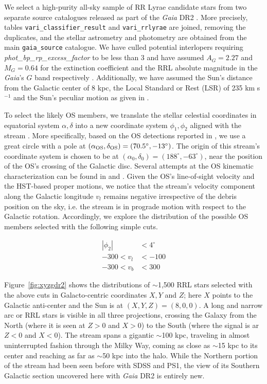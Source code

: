 \documentclass[a4paper,useAMS,usenatbib]{mnras}
\newcommand{\Gaia}{{\it Gaia}}
\newcommand{\gaia}{\textit{Gaia} }
\begin{document}
We select a high-purity all-sky sample of RR Lyrae candidate stars
from two separate source catalogues released as part of the \gaia DR2
\citep[][]{Prusti2016, Brown2018}. More precisely, tables
\texttt{vari\_classifier\_result} and \texttt{vari\_rrlyrae}
\citep[see][]{Clementini2018,Holl2018} are joined, removing the
duplicates, and the stellar astrometry and photometry are obtained
from the main \texttt{gaia\_source} catalogue. We have culled
potential interlopers requiring \textit{phot\_bp\_rp\_excess\_factor}
to be less than 3 and have assumed $A_G=2.27$ and $M_G=0.64$ for the
extinction coefficient and the RRL absolute magnitude in the \Gaia's
$G$ band respectively \citep[see][for further
  details]{Iorio2018}. Additionally, we have assumed the Sun's
distance from the Galactic center of 8 kpc, the Local Standard or Rest
(LSR) of 235 km s$^{-1}$ and the Sun's peculiar motion as given in
\citet{LSR}.

To select the likely OS members, we translate the stellar celestial
coordinates in equatorial system $\alpha, \delta$ into a new
coordinate system $\phi_1, \phi_2$ aligned with the stream \citep[see
  e.g.][]{Koposov2010}. More specifically, based on the OS detections
reported in \citet{OS_V, OS_C, Newberg2010}, we use a great circle
with a pole at $(\alpha_{\rm OS}, \delta_{\rm OS})=(70.5^{\circ},
-13^{\circ})$. The origin of this stream's coordinate system is chosen
to be at $(\alpha_0, \delta_0)=(188^{\circ}, -63^{\circ})$, near the
position of the OS's crossing of the Galactic disc. Several attempts
at the OS kinematic characterization can be found in
\citet{Newberg2010} and \citet{Sohn2016}. Given the OS's line-of-sight
velocity and the HST-based proper motions, we notice that the stream's
velocity component along the Galactic longitude $v_l$ remains negative
irrespective of the debris position on the sky, i.e. the stream is in
prograde motion with respect to the Galactic rotation. Accordingly, we
explore the distribution of the possible OS members selected with the
following simple cuts.

%
\begin{equation}
  \begin{aligned}
    |\phi_2| &< 4^{\circ}\\
    -300<v_l &<-100\\
    -300<v_b &<300
  \end{aligned}
\end{equation}
%

Figure~\ref{fig:xyzgdr2} shows the distributions of $\sim$1,500 RRL
stars selected with the above cuts in Galacto-centric coordinates
$X,Y$ and $Z$; here $X$ points to the Galactic anti-center and the Sun
is at $(X,Y,Z)=(8,0,0)$. A long and narrow arc or RRL stars is visible
in all three projections, crossing the Galaxy from the North (where it
is seen at $Z>0$ and $X>0$) to the South (where the signal is ar $Z<0$
and $X<0$). The stream spans a gigantic $\sim$100 kpc, traveling in
almost uninterrupted fashion through the Milky Way, coming as close as
$\sim$15 kpc to its center and reaching as far as $\sim$50 kpc into
the halo. While the Northern portion of the stream had been seen
before with SDSS and PS1, the view of its Southern Galactic section
uncovered here with \gaia DR2 is entirely new.
\end{document}
